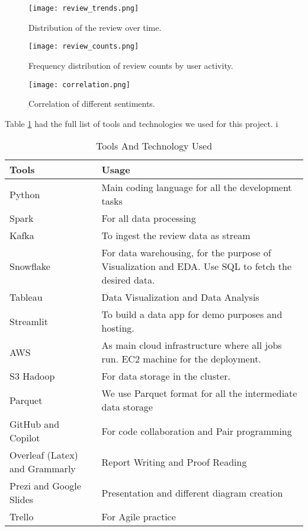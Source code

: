 \documentclass[conference]{IEEEtran}
\begin{document}
\begin{figure}[h]
    \label{review_trends}
    \centering
    \texttt{[image: review\_trends.png]}
    \caption{Distribution of the review over time.}
\end{figure}

\begin{figure*}[h]
    \label{review_counts}
    \centering
    \texttt{[image: review\_counts.png]}
    \caption{Frequency distribution of review counts by user activity.}
\end{figure*}

\begin{figure}[h]
    \label{correlation}
    \centering
    \texttt{[image: correlation.png]}
    \caption{Correlation of different sentiments.}
\end{figure}

Table \ref{table:tools_and_tech} had the full list of tools and technologies we used for this project. i

\begin{table}[h]
    \renewcommand{\arraystretch}{1.5}
    \caption{Tools And Technology Used}
    \label{table:tools_and_tech}
    \begin{tabular}{|p{1.0in}|p{2.0in}|}
    \hline
    \textbf{Tools } & \textbf{Usage} \\ 
    \hline
    \hline
    Python & Main coding language for all the development tasks \\
    \hline
    Spark & For all data processing \\ 
    \hline
    Kafka & To ingest the review data as stream \\ 
    \hline
    Snowflake & For data warehousing, for the purpose of Visualization and EDA. Use SQL to fetch the desired data.  \\
    \hline
    Tableau & Data Visualization and Data Analysis  \\
    \hline
    Streamlit & To build a data app for demo purposes and hosting.  \\
    \hline
    AWS & As main cloud infrastructure where all jobs run. EC2 machine for the deployment. \\
    \hline
    S3 Hadoop & For data storage in the cluster. \\
    \hline
    Parquet & We use Parquet format for all the intermediate data storage \\
    \hline
    GitHub and Copilot & For code collaboration and Pair programming \\
    \hline
    Overleaf (Latex) and Grammarly & Report Writing and Proof Reading \\
    \hline
    Prezi and Google Slides & Presentation and different diagram creation \\
    \hline
    Trello & For Agile practice \\
    \hline
  \end{tabular}
\end{table}
\end{document}
